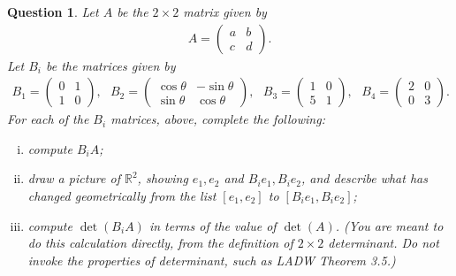 \documentclass[12pt]{article}
\newtheorem{question}[thm]{Question}
\def\real{{\mathbb R}}
\newcommand{\MatrixTwoTwo}[4]{\begin{pmatrix} #1 &#2\\ #3 &#4 \end{pmatrix}}
\begin{document}
\vspace{1cm}

\begin{question}
	\normalfont
	
	
	Let $A$ be the $2\times2$ matrix given by
	\begin{align*}
		A = \MatrixTwoTwo{a}{b}{c}{d}.
	\end{align*}
	Let $B_i$ be the matrices given by
			\begin{align*}
				B_1 = \MatrixTwoTwo{0}{1}{1}{0},\ \ \ 
				B_2 = \MatrixTwoTwo{\cos\theta}{-\sin\theta}{\sin\theta}{\cos\theta},\ \ \
				B_3 = \MatrixTwoTwo{1}{0}{5}{1},\ \ \
				B_4 = \MatrixTwoTwo{2}{0}{0}{3}.
			\end{align*}
	For each of the $B_i$ matrices, above, complete the following:
	\begin{enumerate}[(i)]
		\item compute $B_iA$;
		\item draw a picture of $\real^2$, showing $e_1, e_2$ and $B_ie_1, B_ie_2$, and describe what has changed geometrically from the list $[e_1, e_2]$ to $[B_ie_1, B_ie_2]$;
		\item compute $\det(B_iA)$ in terms of the value of $\det(A)$.  (You are meant to do this calculation directly, from the definition of $2\times2$ determinant. Do not invoke the properties of determinant, such as LADW Theorem 3.5.)
	\end{enumerate}
\end{question}



\vspace{1cm}
\end{document}
